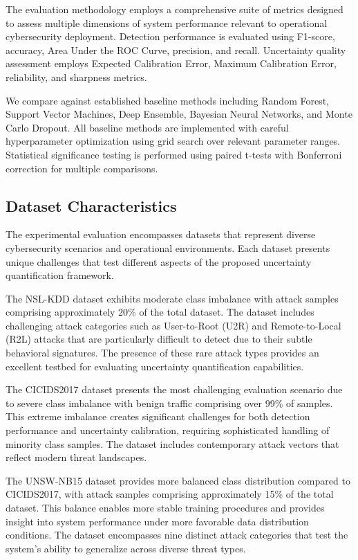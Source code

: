 \documentclass[journal]{IEEEtran}
\begin{document}
The evaluation methodology employs a comprehensive suite of metrics designed to assess multiple dimensions of system performance relevant to operational cybersecurity deployment. Detection performance is evaluated using F1-score, accuracy, Area Under the ROC Curve, precision, and recall. Uncertainty quality assessment employs Expected Calibration Error, Maximum Calibration Error, reliability, and sharpness metrics.

We compare against established baseline methods including Random Forest, Support Vector Machines, Deep Ensemble, Bayesian Neural Networks, and Monte Carlo Dropout. All baseline methods are implemented with careful hyperparameter optimization using grid search over relevant parameter ranges. Statistical significance testing is performed using paired t-tests with Bonferroni correction for multiple comparisons.

\subsection{Dataset Characteristics}

The experimental evaluation encompasses datasets that represent diverse cybersecurity scenarios and operational environments. Each dataset presents unique challenges that test different aspects of the proposed uncertainty quantification framework.

The NSL-KDD dataset exhibits moderate class imbalance with attack samples comprising approximately 20\% of the total dataset. The dataset includes challenging attack categories such as User-to-Root (U2R) and Remote-to-Local (R2L) attacks that are particularly difficult to detect due to their subtle behavioral signatures. The presence of these rare attack types provides an excellent testbed for evaluating uncertainty quantification capabilities.

The CICIDS2017 dataset presents the most challenging evaluation scenario due to severe class imbalance with benign traffic comprising over 99\% of samples. This extreme imbalance creates significant challenges for both detection performance and uncertainty calibration, requiring sophisticated handling of minority class samples. The dataset includes contemporary attack vectors that reflect modern threat landscapes.

The UNSW-NB15 dataset provides more balanced class distribution compared to CICIDS2017, with attack samples comprising approximately 15\% of the total dataset. This balance enables more stable training procedures and provides insight into system performance under more favorable data distribution conditions. The dataset encompasses nine distinct attack categories that test the system's ability to generalize across diverse threat types.
\end{document}
